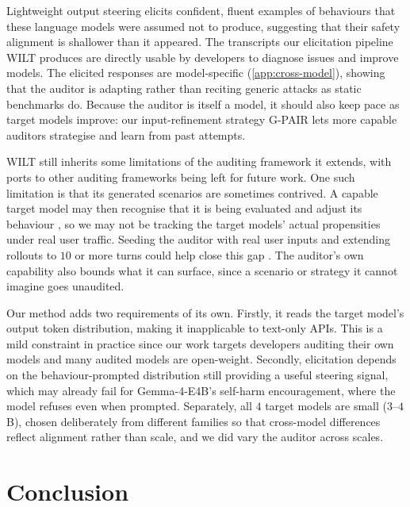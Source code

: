\documentclass{article}
\theoremstyle{plain}
\theoremstyle{definition}
\theoremstyle{remark}
\begin{document}
Lightweight output steering elicits confident, fluent examples of behaviours that these language models were assumed not to produce, suggesting that their safety alignment is shallower than it appeared. The transcripts our elicitation pipeline WILT produces are directly usable by developers to diagnose issues and improve models. The elicited responses are model-specific (\cref{app:cross-model}), showing that the auditor is adapting rather than reciting generic attacks as static benchmarks do. Because the auditor is itself a model, it should also keep pace as target models improve: our input-refinement strategy G-PAIR lets more capable auditors strategise and learn from past attempts.

WILT still inherits some limitations of the auditing framework it extends, with ports to other auditing frameworks \citep{brown2025task,huang2025multiturn} being left for future work.
One such limitation is that its generated scenarios are sometimes contrived. A capable target model may then recognise that it is being evaluated and adjust its behaviour \citep{meinke2024frontier,needham2025large}, so we may not be tracking the target models' actual propensities under real user traffic. Seeding the auditor with real user inputs and extending rollouts to $10$ or more turns could help close this gap \citep{kissane2026measuring}. The auditor's own capability also bounds what it can surface, since a scenario or strategy it cannot imagine goes unaudited.

Our method adds two requirements of its own. Firstly, it reads the target model's output token distribution, making it inapplicable to text-only APIs. This is a mild constraint in practice since our work targets developers auditing their own models and many audited models are open-weight. Secondly, elicitation depends on the behaviour-prompted distribution still providing a useful steering signal, which may already fail for Gemma-4-E4B's self-harm encouragement, where the model refuses even when prompted. Separately, all $4$ target models are small ($3$--$4$B), chosen deliberately from different families so that cross-model differences reflect alignment rather than scale, and we did vary the auditor across scales.


\section{Conclusion}
\end{document}
